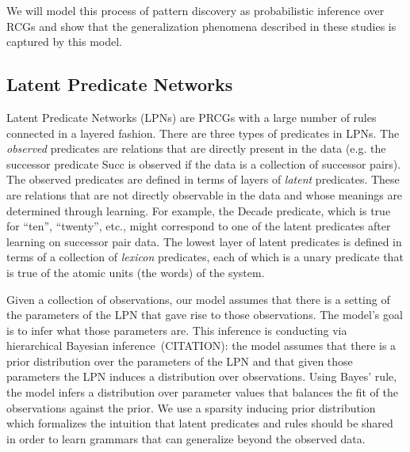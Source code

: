 \documentclass[10pt,letterpaper]{article}
\begin{document}
We will model this process of pattern discovery as probabilistic
inference over RCGs and show that the generalization phenomena
described in these studies is captured by this model. 

\subsection{Latent Predicate Networks}


Latent Predicate Networks (LPNs) are PRCGs with a large number of
rules connected in a layered fashion. There are three types of
predicates in LPNs. The \emph{observed} predicates are relations that
are directly present in the data (e.g. the successor predicate Succ is
observed if the data is a collection of successor pairs). The observed
predicates are defined in terms of layers of \emph{latent} predicates.
These are relations that are not directly observable in the data and
whose meanings are determined through learning. For example, the
Decade predicate, which is true for ``ten'', ``twenty'', etc., might
correspond to one of the latent predicates after learning on successor
pair data. The lowest layer of latent predicates is defined in terms
of a collection of \emph{lexicon} predicates, each of which is a unary
predicate that is true of the atomic units (the words) of the system.

Given a collection of observations, our model assumes that there is a
setting of the parameters of the LPN that gave rise to those
observations. The model's goal is to infer what those parameters
are. This inference is conducting via hierarchical Bayesian
inference~(CITATION): the model assumes that there is a prior
distribution over the parameters of the LPN and that given those
parameters the LPN induces a distribution over observations. Using
Bayes' rule, the model infers a distribution over parameter values
that balances the fit of the observations against the prior. We use a
sparsity inducing prior distribution which formalizes the intuition
that latent predicates and rules should be shared in order to learn
grammars that can generalize beyond the observed data.
\end{document}
